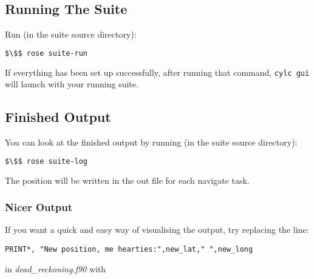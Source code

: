 \subsection{Running The Suite}

Run (in the suite source directory):

\begin{lstlisting}[mathescape, language=bash]
$\$$ rose suite-run
\end{lstlisting}

If everything has been set up successfully, after running that command,
\lstinline{cylc gui} will launch with your running suite.

\subsection{Finished Output}

You can look at the finished output by running (in the suite source directory):

\begin{lstlisting}[mathescape, language=bash]
$\$$ rose suite-log
\end{lstlisting}

The position will be written in the out file for each navigate task.

\subsubsection{Nicer Output}

If you want a quick and easy way of visualising the output, try replacing the line:

\lstset{language=Fortran}
\begin{lstlisting}[columns=fullflexible]
PRINT*, "New position, me hearties:",new_lat," ",new_long
\end{lstlisting}

in {\em dead\_reckoning.f90} with

